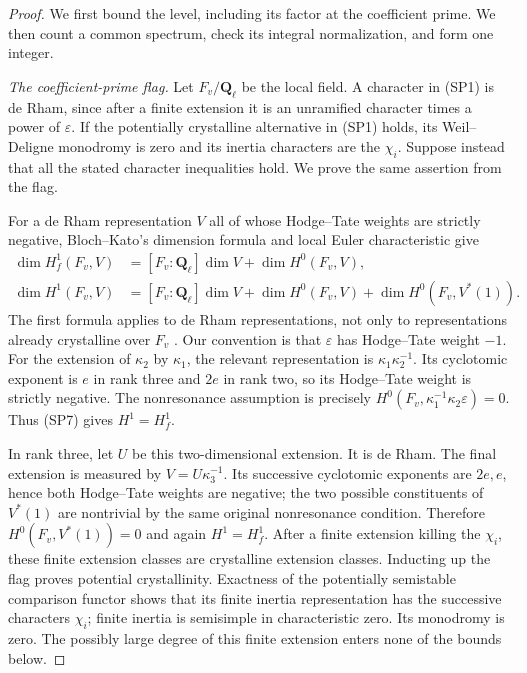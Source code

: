 \begin{proof}
We first bound the level, including its factor at the coefficient
prime.  We then count a common spectrum, check its integral
normalization, and form one integer.

\emph{The coefficient-prime flag.}
Let $F_v/\mathbf Q_\ell$ be the local field.  A character
in (SP1) is de Rham, since after a finite extension it is an
unramified character times a power of $\varepsilon$.  If the
potentially crystalline alternative in (SP1) holds, its Weil--Deligne
monodromy is zero and its inertia characters are the $\chi_i$.
Suppose instead that all the stated character inequalities hold.
We prove the same assertion from the flag.

For a de Rham representation $V$ all of whose Hodge--Tate weights
are strictly negative, Bloch--Kato's dimension formula and local
Euler characteristic give
\[
 \begin{split}
 \dim H_f^1(F_v,V)&=[F_v:\mathbf Q_\ell]\dim V+\dim H^0(F_v,V),\\
 \dim H^1(F_v,V)&=[F_v:\mathbf Q_\ell]\dim V+\dim H^0(F_v,V)
                          +\dim H^0(F_v,V^*(1)).
 \end{split}                                                   \tag{SP7}
\]
The first formula applies to de Rham representations, not only
to representations already crystalline over $F_v$
\cite[Corollary~3.8.4]{bloch-kato-tamagawa}.
Our convention is that $\varepsilon$ has Hodge--Tate weight $-1$.
For the extension of $\kappa_2$ by $\kappa_1$, the relevant
representation is $\kappa_1\kappa_2^{-1}$.  Its cyclotomic
exponent is $e$ in rank three and $2e$ in rank two, so its
Hodge--Tate weight is strictly negative.  The nonresonance
assumption is precisely
$H^0(F_v,\kappa_1^{-1}\kappa_2\varepsilon)=0$.
Thus (SP7) gives $H^1=H_f^1$.

In rank three, let $U$ be this two-dimensional extension.
It is de Rham.  The final extension is measured by
$V=U\kappa_3^{-1}$.  Its successive cyclotomic exponents
are $2e,e$, hence both Hodge--Tate weights are negative;
the two possible constituents of $V^*(1)$ are nontrivial
by the same original nonresonance condition.  Therefore
$H^0(F_v,V^*(1))=0$ and again $H^1=H_f^1$.
After a finite extension killing the $\chi_i$, these finite
extension classes are crystalline extension classes.  Inducting
up the flag proves potential crystallinity.  Exactness of the
potentially semistable comparison functor shows that its finite
inertia representation has the successive characters $\chi_i$;
finite inertia is semisimple in characteristic zero.  Its
monodromy is zero.  The possibly large degree of this finite
extension enters none of the bounds below.


\end{proof}
